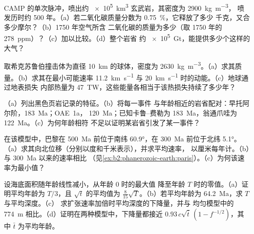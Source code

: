 \begin{exercise}[$\star\star$]\label{exo:b2:phanerozoic-earth:6}
CAMP 的单次脉冲，喷出约 \qty{e5}{km^3} 玄武岩，其密度为 \qty{2900}{kg.m^{-3}}，
喷发历时约 500 年。（a）若二氧化碳质量分数为 \qty{0.75}{\percent}，它释放了多少
千克，又合多少摩尔？（b）1750 年空气所含
二氧化碳的质量为多少（取 1750 年的 \qty{278}{ppm}）？（c）加以比较。（d）整个岩省
约 \qty{e5}{Gt}，能提供多少个这样的大气？
\end{exercise}

\begin{exercise}[$\star\star$]\label{exo:b2:phanerozoic-earth:7}
取希克苏鲁伯撞击体为直径 \qty{10}{km} 的球体，密度为
\qty{2630}{kg.m^{-3}}。（a）求其质量。（b）求其在最小可能速率
\qty{11.2}{km.s^{-1}} 与 \qty{20}{km.s^{-1}} 时的动能。（c）地球通过地表损失
内部热量为 \qty{47}{TW}，这些能量各相当于该热损失持续了多少年？
\end{exercise}

\begin{exercise}[$\star\star$]\label{exo:b2:phanerozoic-earth:8}
（a）列出黑色页岩记录的特征。（b）将每一事件
与年龄相近的岩省配对：早托阿尔阶，\qty{183}{Ma}；OAE~1a，
\qty{120}{Ma}；已知卡鲁–费勒为 \qty{183}{Ma}，翁通爪哇为 \qty{122}{Ma}。（c）为何年龄相符
不足以证明某岩省引发了某一事件？
\end{exercise}

\begin{exercise}[$\star\star$]\label{exo:b2:phanerozoic-earth:9}
在该模型中，巴黎在 \qty{500}{Ma} 前位于南纬 \ang{60.9}，在 \qty{300}{Ma} 前位于北纬 \ang{5.1}。
（a）求其向北位移（分别以度和千米表示），并求平均速率，
以厘米每年计。（b）与 \qty{300}{Ma} 以来的速率相比
（见\cref{ex:b2:phanerozoic-earth:paris}）。（c）为何该速率为最小值？
\end{exercise}

\begin{exercise}[$\star\star\star$]\label{exo:b2:phanerozoic-earth:10}
设海底面积随年龄线性减小，从年龄 0 时的最大值
降至年龄 $T$ 时的零值。（a）证明平均年龄为 $T/3$，且 $\sqrt t$ 的平均值为
$\tfrac{8}{15}\sqrt T$。（b）若平均年龄为 \qty{64.2}{Ma}，求 $T$ 与平均深度。（c）
求扩张速率加倍时平均深度的下降量，并与
均匀模型中的 \qty{774}{m} 相比。（d）证明在两种模型中，下降量都接近 $0.93\,c\sqrt{\bar
t}\,(1 - f^{-1/2})$，其中 $\bar t$ 为平均年龄。
\end{exercise}

